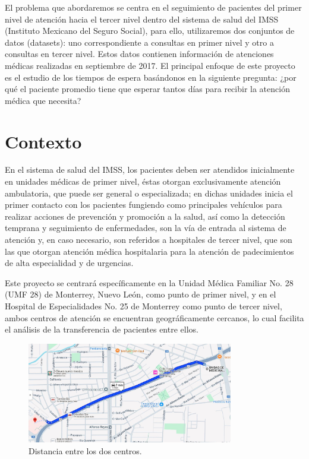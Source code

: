 \documentclass[10pt]{article}
\begin{document}
    El problema que abordaremos se centra en el seguimiento de pacientes del primer nivel de atención hacia el tercer nivel dentro del sistema de salud del IMSS (Instituto Mexicano del Seguro Social), para ello, utilizaremos dos conjuntos de datos (datasets): uno correspondiente a consultas en primer nivel y otro a consultas en tercer nivel. Estos datos contienen información de atenciones médicas realizadas en septiembre de 2017. El principal enfoque de este proyecto es el estudio de los tiempos de espera basándonos en la siguiente pregunta: ¿por qué el paciente promedio tiene que esperar tantos días para recibir la atención médica que necesita?

	\section{Contexto}
	En el sistema de salud del IMSS, los pacientes deben ser atendidos inicialmente en unidades médicas de primer nivel, éstas otorgan exclusivamente atención ambulatoria, que puede ser general o especializada; en dichas unidades inicia el primer contacto con los pacientes fungiendo como principales vehículos para realizar acciones de prevención y promoción a la salud, así como la detección temprana y seguimiento de enfermedades, son la vía de entrada al sistema de atención y, en caso necesario, son referidos a hospitales de tercer nivel, que son las que otorgan atención médica hospitalaria para la atención de padecimientos de alta especialidad y de urgencias. \par
    Este proyecto se centrará específicamente en la Unidad Médica Familiar No. 28 (UMF 28) de Monterrey, Nuevo León, como punto de primer nivel, y en el Hospital de Especialidades No. 25 de Monterrey como punto de tercer nivel, ambos centros de atención se encuentran geográficamente cercanos, lo cual facilita el análisis de la transferencia de pacientes entre ellos.
    
    \begin{figure}[h]
		\centering
		\includegraphics[width=90mm]{./images/mapa.jpg}
		\caption{Distancia entre los dos centros.}
	\end{figure}
	\FloatBarrier
\end{document}
